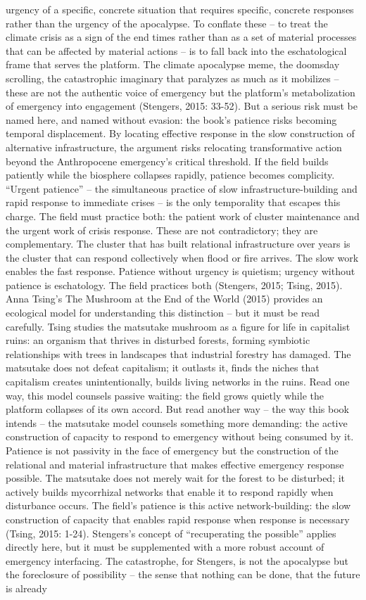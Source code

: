 urgency of a specific, concrete situation that requires specific, concrete responses rather than the urgency of the apocalypse. To conflate these – to treat the climate crisis as a sign of the end times rather than as a set of material processes that can be affected by material actions – is to fall back into the eschatological frame that serves the platform. The climate apocalypse meme, the doomsday scrolling, the catastrophic imaginary that paralyzes as much as it mobilizes – these are not the authentic voice of emergency but the platform’s metabolization of emergency into engagement (Stengers, 2015: 33-52). But a serious risk must be named here, and named without evasion: the book’s patience risks becoming temporal displacement. By locating effective response in the slow construction of alternative infrastructure, the argument risks relocating transformative action beyond the Anthropocene emergency’s critical threshold. If the field builds patiently while the biosphere collapses rapidly, patience becomes complicity. “Urgent patience” – the simultaneous practice of slow infrastructure-building and rapid response to immediate crises – is the only temporality that escapes this charge. The field must practice both: the patient work of cluster maintenance and the urgent work of crisis response. These are not contradictory; they are complementary. The cluster that has built relational infrastructure over years is the cluster that can respond collectively when flood or fire arrives. The slow work enables the fast response. Patience without urgency is quietism; urgency without patience is eschatology. The field practices both (Stengers, 2015; Tsing, 2015). Anna Tsing’s The Mushroom at the End of the World (2015) provides an ecological model for understanding this distinction – but it must be read carefully. Tsing studies the matsutake mushroom as a figure for life in capitalist ruins: an organism that thrives in disturbed forests, forming symbiotic relationships with trees in landscapes that industrial forestry has damaged. The matsutake does not defeat capitalism; it outlasts it, finds the niches that capitalism creates unintentionally, builds living networks in the ruins. Read one way, this model counsels passive waiting: the field grows quietly while the platform collapses of its own accord. But read another way – the way this book intends – the matsutake model counsels something more demanding: the active construction of capacity to respond to emergency without being consumed by it. Patience is not passivity in the face of emergency but the construction of the relational and material infrastructure that makes effective emergency response possible. The matsutake does not merely wait for the forest to be disturbed; it actively builds mycorrhizal networks that enable it to respond rapidly when disturbance occurs. The field’s patience is this active network-building: the slow construction of capacity that enables rapid response when response is necessary (Tsing, 2015: 1-24). Stengers’s concept of “recuperating the possible” applies directly here, but it must be supplemented with a more robust account of emergency interfacing. The catastrophe, for Stengers, is not the apocalypse but the foreclosure of possibility – the sense that nothing can be done, that the future is already 
